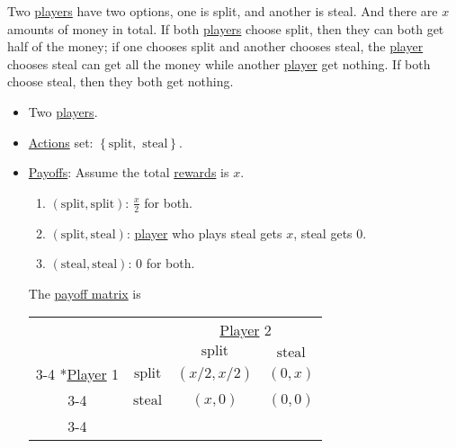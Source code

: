 \begin{eg}\label{eg:golden-ball}
	Two \hyperref[def:player]{players} have two options, one is split, and another is steal. And there are \(x\) amounts of money in total. If both \hyperref[def:player]{players} choose split, then they can both get half of the money; if one chooses split and another chooses steal, the \hyperref[def:player]{player} chooses steal can get all the money while another \hyperref[def:player]{player} get nothing. If both choose steal, then they both get nothing.
	\begin{itemize}
		\item Two \hyperref[def:player]{players}.
		\item \hyperref[def:strategy]{Actions} set: \(\left\{\text{split}, \text{ steal}\right\}\).
		\item \hyperref[def:reward]{Payoffs}: Assume the total \hyperref[def:reward]{rewards} is \(x\).
		      \begin{enumerate}
			      \item \((\text{split}, \text{split})\): \(\frac{x}{2}\) for both.
			      \item \((\text{split}, \text{steal})\): \hyperref[def:player]{player} who plays steal gets \(x\), steal gets \(0\).
			      \item \((\text{steal}, \text{steal})\): \(0\) for both.
		      \end{enumerate}
		      The \hyperref[def:payoff-matrix]{payoff matrix} is
		      \begin{table}[H]
			      \centering
			      \setlength{\extrarowheight}{2pt}
			      \begin{tabular}{cc|c|c|}
				                                                     & \multicolumn{1}{c}{} & \multicolumn{2}{c}{\hyperref[def:player]{Player} 2}                                      \\
				                                                     & \multicolumn{1}{c}{} & \multicolumn{1}{c}{$\text{split}$}                  & \multicolumn{1}{c}{$\text{steal}$} \\\cline{3-4}
				      \multirow{2}*{\hyperref[def:player]{Player} 1} & $\text{split}$       & $(x/2, x/2)$                                        & $(0, x)$                           \\\cline{3-4}
				                                                     & $\text{steal}$       & $(x, 0)$                                            & $(0, 0)$                           \\\cline{3-4}
			      \end{tabular}
		      \end{table}
	\end{itemize}


\end{eg}
